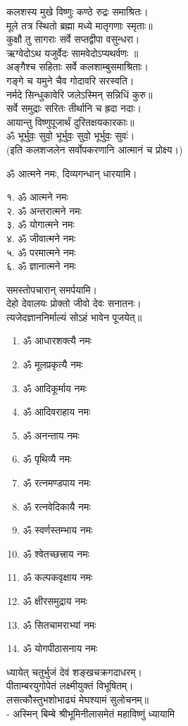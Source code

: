 कलशस्य मुखे विष्णुः कण्ठे रुद्रः समाश्रितः।\\
मूले तत्र स्थितो ब्रह्मा मध्ये मातृगणाः स्मृताः॥\\
कुक्षौ तु सागराः सर्वे सप्तद्वीपा वसुन्धरा।\\
ऋग्वेदोऽथ यजुर्वेदः सामवेदोऽप्यथर्वणः ॥\\
अङ्गैश्च सहिताः सर्वे कलशाम्बुसमाश्रिताः।\\
गङ्गे च यमुने चैव गोदावरि सरस्वति।\\
नर्मदे सिन्धुकावेरि जलेऽस्मिन् सन्निधिं कुरु॥\\
सर्वे समुद्राः सरितः तीर्थानि च ह्रदा नदाः।\\
आयान्तु विष्णुपूजार्थं दुरितक्षयकारकाः॥\\
ॐ भूर्भुवः॒ सुवो॒ भूर्भुवः॒ सुवो॒ भूर्भुवः॒ सुवः॑।\\

(इति कलशजलेन सर्वोपकरणानि आत्मानं च प्रोक्ष्य।)

ॐ आत्मने नमः, दिव्यगन्धान् धारयामि।
\begin{multicols}{2}
१. ॐ आत्मने नमः\\
२. ॐ अन्तरात्मने नमः\\
३. ॐ योगात्मने नमः\\
४. ॐ जीवात्मने नमः\\
५. ॐ परमात्मने नमः\\
६. ॐ ज्ञानात्मने नमः
\end{multicols}
समस्तोपचारान् समर्पयामि।\\

देहो देवालयः प्रोक्तो जीवो देवः सनातनः।\\
त्यजेदज्ञाननिर्माल्यं सोऽहं भावेन पूजयेत्॥\\

\begin{multicols}{2}
\begin{enumerate}
\item ॐ आधारशक्त्यै नमः
\item ॐ मूलप्रकृत्यै नमः
\item ॐ आदिकूर्माय नमः 
\item ॐ आदिवराहाय नमः
\item ॐ अनन्ताय नमः
\item ॐ पृथिव्यै नमः
\item ॐ रत्नमण्डपाय नमः
\item ॐ रत्नवेदिकायै नमः
\item ॐ स्वर्णस्तम्भाय नमः
\item ॐ श्वेतच्छत्त्राय नमः
\item ॐ कल्पकवृक्षाय नमः
\item ॐ क्षीरसमुद्राय नमः 
\item ॐ सितचामराभ्यां नमः
\item ॐ योगपीठासनाय नमः
\end{enumerate}
\end{multicols}
 ध्यायेत् चतुर्भुजं देवं शङ्खचक्रगदाधरम्।\\
पीताम्बरयुगोपेतं लक्ष्मीयुक्तं विभूषितम्। \\
लसत्कौस्तुभशोभाढ्यं मेघश्यामं सुलोचनम्॥\\
- अस्मिन् बिम्बे श्रीभूमिनीलासमेतं महाविष्णुं ध्यायामि\\

